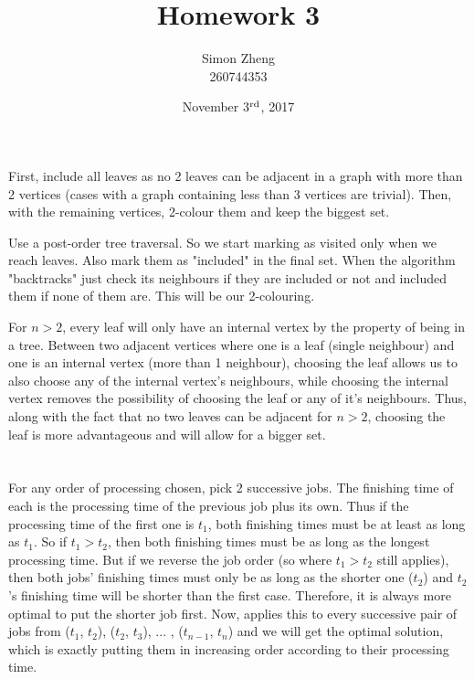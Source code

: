 \documentclass[11pt,letterpaper]{article}
\author{Simon Zheng\\260744353}
\title{Homework 3}
\date{November 3$^{\textnormal{rd}}$, 2017}
\begin{document}
	\maketitle
	\thispagestyle{fancy}
	
	\section{}
		First, include all leaves as no 2 leaves can be adjacent in a graph with more than 2 vertices (cases with a graph containing less than 3 vertices are trivial). Then, with the remaining vertices, 2-colour them and keep the biggest set.
		
		Use a post-order tree traversal.
		So we start marking as visited only when we reach leaves. Also mark them as "included" in the final set.
		When the algorithm "backtracks" just check its neighbours if they are included or not and included them if none of them are. This will be our 2-colouring.
		
		For $n>2$, every leaf will only have an internal vertex by the property of being in a tree. Between two adjacent vertices where one is a leaf (single neighbour) and one is an internal vertex (more than 1 neighbour), choosing the leaf allows us to also choose any of the internal vertex's neighbours, while choosing the internal vertex removes the possibility of choosing the leaf or any of it's neighbours.
		Thus, along with the fact that no two leaves can be adjacent for $n>2$, choosing the leaf is more advantageous and will allow for a bigger set.
		
	\section{}
		For any order of processing chosen, pick 2 successive jobs.
		The finishing time of each is the processing time of the previous job plus its own. Thus if the processing time of the first one is $t_1$, both finishing times must be at least as long as $t_1$.
		So if $t_1 > t_2$, then both finishing times must be as long as the longest processing time.
		But if we reverse the job order (so where $t_1 > t_2$ still applies), then both jobs' finishing times must only be as long as the shorter one ($t_2$) and $t_2$'s finishing time will be shorter than the first case.
		Therefore, it is always more optimal to put the shorter job first.
		Now, applies this to every successive pair of jobs from ($t_1$, $t_2$), ($t_2$, $t_3$), ... , ($t_{n-1}$, $t_n$) and we will get the optimal solution, which is exactly putting them in increasing order according to their processing time.
		
\end{document}
